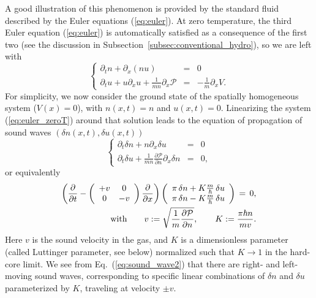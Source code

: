 \documentclass[onecolumn,amsfonts,showpacs,superscriptaddress]{revtex4-1}
\begin{document}
A good illustration of this phenomenon is provided by the standard fluid described by the Euler equations (\ref{eq:euler}). At zero temperature, the third Euler equation (\ref{eq:euler}) is automatically satisfied as a consequence of the first two (see the discussion in Subsection~\ref{subsec:conventional_hydro}), so we are left with
\begin{equation}
    \label{eq:euler_zeroT}
    \left\{ \begin{array}{rcl}
        \partial_t n + \partial_x (n u) & = & 0 \\
        \partial_t u + u \partial_x u + \frac{1}{m n} \partial_x \mathcal{P} & = & - \frac{1}{m} \partial_x V .
    \end{array}  \right.
\end{equation}
For simplicity, we now consider the ground state of the spatially homogeneous system ($V(x)=0$), with $n (x,t) = n$ and $u(x,t) = 0$. Linearizing the system (\ref{eq:euler_zeroT}) around that solution leads to the equation of propagation of sound waves $(\delta n(x,t), \delta u(x,t))$
\begin{equation}
    \label{eq:sound_wave}
    \left\{ \begin{array}{rcl}
        \partial_t \delta n + n  \partial_x \delta u  & = & 0 \\
        \partial_t \delta u + \frac{1}{m n} \frac{\partial \mathcal{P}}{\partial n} \partial_x \delta n   & = & 0 ,
    \end{array}  \right.
\end{equation}
or equivalently
\begin{eqnarray}
    \label{eq:sound_wave2}
   \left( \frac{\partial}{\partial t}  -  \left( \begin{array}{cc}
        + v & 0 \\  0 & - v
    \end{array} \right) \frac{\partial}{\partial x} \right)  \left( \begin{array}{c}
       \pi \,  \delta n + K  \frac{m}{ \hbar} \, \delta  u  \\
         \pi \,  \delta n - K  \frac{m}{ \hbar} \, \delta  u
    \end{array} \right) \, = \, 0, \\
\nonumber  {\rm with} \qquad   v := \sqrt{\frac{1}{m}\frac{\partial \mathcal{P}}{\partial n}},  \qquad  K := \frac{\pi \hbar n}{m v} .
\end{eqnarray}
Here $v$ is the sound velocity in the gas, and $K$ is a dimensionless parameter (called Luttinger parameter, see below) normalized such that $K \rightarrow 1$ in the hard-core limit. We see from Eq.~(\ref{eq:sound_wave2}) that there are right- and left-moving sound waves, corresponding to specific linear combinations of $\delta n$ and $\delta u$ parameterized by $K$, traveling at velocity $\pm v$.
\end{document}
